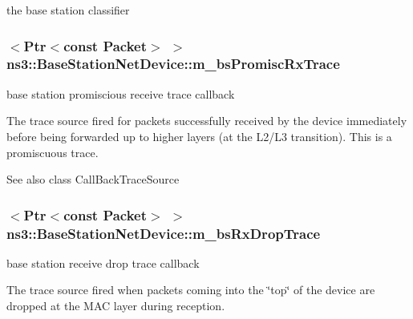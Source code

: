 the base station classifier 

\subsubsection[{\texorpdfstring{m\+\_\+bs\+Promisc\+Rx\+Trace}{m_bsPromiscRxTrace}}]{$<${\bf Ptr}$<$const {\bf Packet}$>$ $>$ ns3\+::\+Base\+Station\+Net\+Device\+::m\+\_\+bs\+Promisc\+Rx\+Trace\hspace{0.3cm}{\ttfamily [private]}}\hypertarget{classns3_1_1BaseStationNetDevice_af74f0fa68c65b8e0b1e19e67a9c19cea}{}\label{classns3_1_1BaseStationNetDevice_af74f0fa68c65b8e0b1e19e67a9c19cea}


base station promiscious receive trace callback 

The trace source fired for packets successfully received by the device immediately before being forwarded up to higher layers (at the L2/\+L3 transition). This is a promiscuous trace.

\begin{DoxySeeAlso}{See also}
class Call\+Back\+Trace\+Source 
\end{DoxySeeAlso}
\subsubsection[{\texorpdfstring{m\+\_\+bs\+Rx\+Drop\+Trace}{m_bsRxDropTrace}}]{$<${\bf Ptr}$<$const {\bf Packet}$>$ $>$ ns3\+::\+Base\+Station\+Net\+Device\+::m\+\_\+bs\+Rx\+Drop\+Trace\hspace{0.3cm}{\ttfamily [private]}}\hypertarget{classns3_1_1BaseStationNetDevice_a4835b0ad2180229900fc09ae5207bd8f}{}\label{classns3_1_1BaseStationNetDevice_a4835b0ad2180229900fc09ae5207bd8f}


base station receive drop trace callback 

The trace source fired when packets coming into the \char`\"{}top\char`\"{} of the device are dropped at the M\+AC layer during reception.

